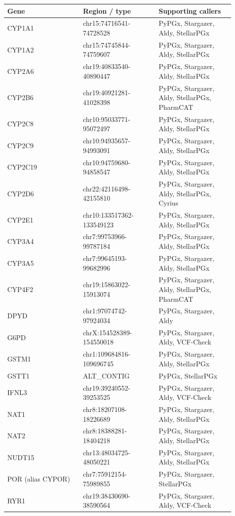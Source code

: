 \documentclass[11pt]{article}
\begin{document}
\begin{longtable}{p{0.31\linewidth}p{0.31\linewidth}p{0.31\linewidth}}
\hline
\textbf{Gene} & \textbf{Region / type} & \textbf{Supporting callers} \\ \hline\endhead
CYP1A1 & chr15:74716541-74728528 & PyPGx, Stargazer, Aldy, StellarPGx \\
CYP1A2 & chr15:74745844-74759607 & PyPGx, Stargazer, Aldy, StellarPGx \\
CYP2A6 & chr19:40833540-40890447 & PyPGx, Stargazer, Aldy, StellarPGx \\
CYP2B6 & chr19:40921281-41028398 & PyPGx, Stargazer, Aldy, StellarPGx, PharmCAT \\
CYP2C8 & chr10:95033771-95072497 & PyPGx, Stargazer, Aldy, StellarPGx \\
CYP2C9 & chr10:94935657-94993091 & PyPGx, Stargazer, Aldy, StellarPGx \\
CYP2C19 & chr10:94759680-94858547 & PyPGx, Stargazer, Aldy, StellarPGx \\
CYP2D6 & chr22:42116498-42155810 & PyPGx, Stargazer, Aldy, StellarPGx, Cyrius \\
CYP2E1 & chr10:133517362-133549123 & PyPGx, Stargazer, Aldy, StellarPGx \\
CYP3A4 & chr7:99753966-99787184 & PyPGx, Stargazer, Aldy, StellarPGx \\
CYP3A5 & chr7:99645193-99682996 & PyPGx, Stargazer, Aldy, StellarPGx \\
CYP4F2 & chr19:15863022-15913074 & PyPGx, Stargazer, Aldy, StellarPGx, PharmCAT \\
DPYD & chr1:97074742-97924034 & PyPGx, Stargazer, Aldy \\
G6PD & chrX:154528389-154550018 & PyPGx, Stargazer, Aldy, VCF-Check \\
GSTM1 & chr1:109684816-109696745 & PyPGx, Stargazer, Aldy, StellarPGx \\
GSTT1 & ALT\_CONTIG & PyPGx, StellarPGx \\
IFNL3 & chr19:39240552-39253525 & PyPGx, Stargazer, Aldy, VCF-Check \\
NAT1 & chr8:18207108-18226689 & PyPGx, Stargazer, Aldy, StellarPGx \\
NAT2 & chr8:18388281-18404218 & PyPGx, Stargazer, Aldy, StellarPGx \\
NUDT15 & chr13:48034725-48050221 & PyPGx, Stargazer, Aldy, StellarPGx \\
POR (alias CYPOR) & chr7:75912154-75989855 & PyPGx, Stargazer, StellarPGx \\
RYR1 & chr19:38430690-38590564 & PyPGx, Stargazer, Aldy, VCF-Check \\

\end{longtable}
\end{document}
